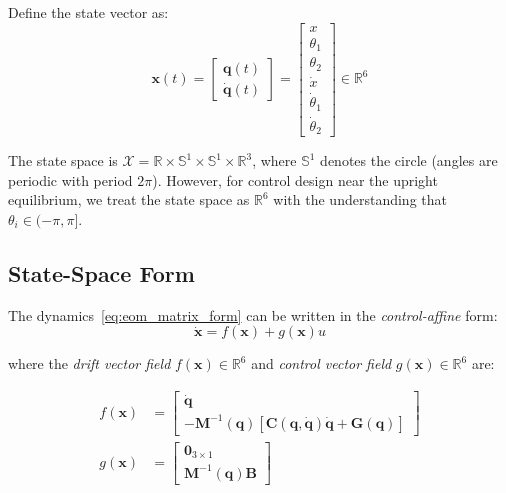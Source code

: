 Define the state vector as:
\begin{equation}
\mathbf{x}(t) = \begin{bmatrix} \mathbf{q}(t) \\ \dot{\mathbf{q}}(t) \end{bmatrix} = \begin{bmatrix} x \\ \theta_1 \\ \theta_2 \\ \dot{x} \\ \dot{\theta}_1 \\ \dot{\theta}_2 \end{bmatrix} \in \mathbb{R}^6
\label{eq:state_vector}
\end{equation}

The state space is $\mathcal{X} = \mathbb{R} \times \mathbb{S}^1 \times \mathbb{S}^1 \times \mathbb{R}^3$, where $\mathbb{S}^1$ denotes the circle (angles are periodic with period $2\pi$). However, for control design near the upright equilibrium, we treat the state space as $\mathbb{R}^6$ with the understanding that $\theta_i \in (-\pi, \pi]$.

\subsection{State-Space Form}

The dynamics~\eqref{eq:eom_matrix_form} can be written in the \textit{control-affine} form:
\begin{equation}
\dot{\mathbf{x}} = f(\mathbf{x}) + g(\mathbf{x}) u
\label{eq:control_affine}
\end{equation}

where the \textit{drift vector field} $f(\mathbf{x}) \in \mathbb{R}^6$ and \textit{control vector field} $g(\mathbf{x}) \in \mathbb{R}^6$ are:

\begin{align}
f(\mathbf{x}) &= \begin{bmatrix}
\dot{\mathbf{q}} \\
-\mathbf{M}^{-1}(\mathbf{q})[\mathbf{C}(\mathbf{q}, \dot{\mathbf{q}})\dot{\mathbf{q}} + \mathbf{G}(\mathbf{q})]
\end{bmatrix} \label{eq:drift_field} \\
g(\mathbf{x}) &= \begin{bmatrix}
\mathbf{0}_{3 \times 1} \\
\mathbf{M}^{-1}(\mathbf{q})\mathbf{B}
\end{bmatrix} \label{eq:control_field}
\end{align}

